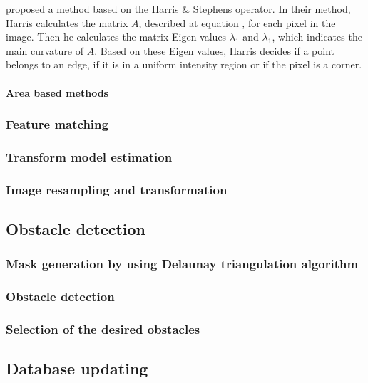 \cite{shi1994good} proposed a method based on the Harris \& Stephens operator. In their method, Harris calculates the matrix $A$, described at equation , for each pixel in the image. Then he calculates the matrix Eigen values $\lambda_1$ and $\lambda_1$, which indicates the main curvature of $A$. Based on these Eigen values, Harris decides if a point belongs to an edge, if it is in a uniform intensity region or if the pixel is a corner.


\paragraph{Area based methods}\label{ch:chapter02_01_02_01_02}
\subsubsection{Feature matching}\label{ch:chapter02_01_02_02}
\subsubsection{Transform model estimation}\label{ch:chapter02_01_02_03}
\subsubsection{Image resampling and transformation}\label{ch:chapter02_01_02_04}
\subsection{Obstacle detection}\label{ch:chapter02_01_03}
\subsubsection{Mask generation by using Delaunay triangulation algorithm}\label{ch:chapter02_01_03_01}
\subsubsection{Obstacle detection}\label{ch:chapter02_01_03_02}
\subsubsection{Selection of the desired obstacles}\label{ch:chapter02_01_03_03}
\subsection{Database updating}\label{ch:chapter02_01_04}
